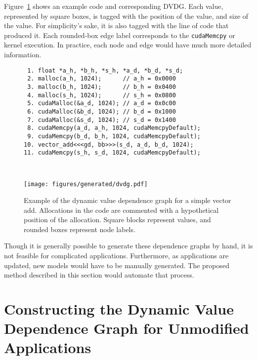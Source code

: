 Figure~\ref{fig:dvdg} shows an example code and corresponding DVDG.
Each value, represented by square boxes, is tagged with the position of the value, and size of the value.
For simplicity's sake, it is also tagged with the line of code that produced it.
Each rounded-box edge label corresponds to the \texttt{cudaMemcpy} or kernel execution.
In practice, each node and edge would have much more detailed information.

\begin{figure}[ht]
	\centering
    \caption[Dynamic value dependence graph]{
        Example of the dynamic value dependence graph for a simple vector add.
        Allocations in the code are commented with a hypothetical position of the allocation.
        Square blocks represent values, and rounded boxes represent node labels.
    }
    \label{fig:dvdg}
        \begin{minipage}{\textwidth}
            \begin{lstlisting}
 1. float *a_h, *b_h, *s_h, *a_d, *b_d, *s_d;
 2. malloc(a_h, 1024);      // a_h = 0x0000
 3. malloc(b_h, 1024);      // b_h = 0x0400
 4. malloc(s_h, 1024);      // s_h = 0x0800
 5. cudaMalloc(&a_d, 1024); // a_d = 0x0c00  
 6. cudaMalloc(&b_d, 1024); // b_d = 0x1000
 7. cudaMalloc(&s_d, 1024); // s_d = 0x1400
 8. cudaMemcpy(a_d, a_h, 1024, cudaMemcpyDefault);
 9. cudaMemcpy(b_d, b_h, 1024, cudaMemcpyDefault);
10. vector_add<<<gd, bb>>>(s_d, a_d, b_d, 1024);
11. cudaMemcpy(s_h, s_d, 1024, cudaMemcpyDefault);
            \end{lstlisting}
        \end{minipage}        
    \\
        \begin{minipage}{\textwidth}
            \centering
            \texttt{[image: figures/generated/dvdg.pdf]}

        \end{minipage}

\end{figure}

Though it is generally possible to generate these dependence graphs by hand, it is not feasible for complicated applications.
Furthermore, as applications are updated, new models would have to be manually generated.
The proposed method described in this section would automate that process.

\section{Constructing the Dynamic Value Dependence Graph for Unmodified Applications}

